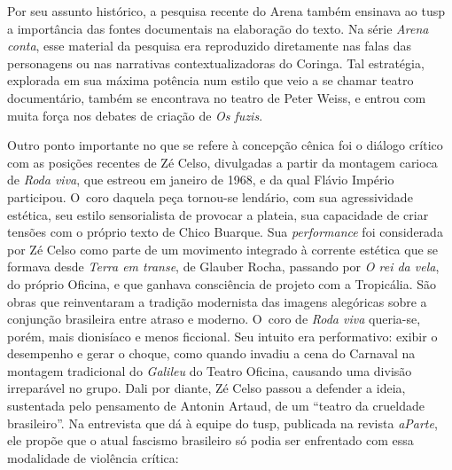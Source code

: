 Por seu assunto histórico, a pesquisa recente do Arena também ensinava
ao {\sc tusp} a importância das fontes documentais na elaboração do texto. Na
série {\it Arena conta}, esse material da pesquisa era reproduzido
diretamente nas falas das personagens ou nas narrativas
contextualizadoras do Coringa. Tal estratégia, explorada em sua máxima
potência num estilo que veio a se chamar teatro documentário,
também se encontrava no teatro de Peter Weiss, e entrou com muita força
nos debates de criação de {\it Os fuzis}.

Outro ponto importante no que se refere à concepção cênica foi o diálogo
crítico com as posições recentes de Zé Celso, divulgadas a partir da
montagem carioca de {\it Roda viva}, que estreou em janeiro de 1968, e
da qual Flávio Império participou. O~coro daquela peça tornou-se
lendário, com sua agressividade estética, seu estilo sensorialista de
provocar a plateia, sua capacidade de criar tensões com o próprio texto
de Chico Buarque. Sua {\it performance} foi considerada por Zé Celso
como parte de um movimento integrado à corrente estética que se formava
desde {\it Terra em transe}, de Glauber Rocha, passando por {\it O rei
da vela}, do próprio Oficina, e que ganhava consciência de projeto com a
Tropicália. São obras que reinventaram a tradição modernista das imagens
alegóricas sobre a conjunção brasileira entre atraso e moderno. O~coro
de {\it Roda viva} queria-se, porém, mais dionisíaco e menos ficcional.
Seu intuito era performativo: exibir o desempenho e gerar o choque, como
quando invadiu a cena do Carnaval na montagem tradicional do
{\it Galileu} do Teatro Oficina, causando uma divisão irreparável no
grupo. Dali por diante, Zé Celso passou a defender a ideia, sustentada
pelo pensamento de Antonin Artaud, de um “teatro da crueldade
brasileiro”. Na entrevista que dá à equipe do {\sc tusp}, publicada na revista
{\it aParte}, ele propõe que o atual fascismo brasileiro só podia ser
enfrentado com essa modalidade de violência crítica:

\startblockquote
{}
\stopblockquote

